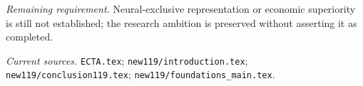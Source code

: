 \par\emph{Remaining requirement.} Neural-exclusive representation or economic superiority is still not established; the research ambition is preserved without asserting it as completed.

\par\emph{Current sources.} \nolinkurl{ECTA.tex}; \nolinkurl{new119/introduction.tex}; \nolinkurl{new119/conclusion119.tex}; \nolinkurl{new119/foundations_main.tex}.

\endgroup

